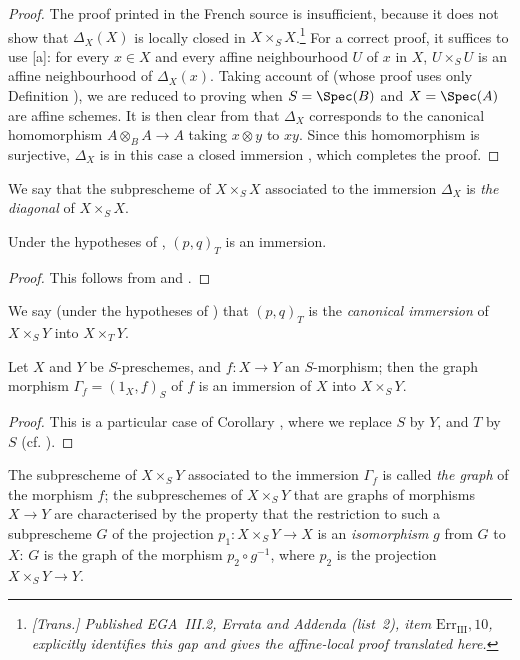 \begin{proof}
The proof printed in the French source is insufficient, because it does not
show that $\Delta_X(X)$ is locally closed in $X\times_S X$.\footnote{\emph{[Trans.] Published EGA~III.2, Errata and Addenda (list~2), item $\mathrm{Err}_{\mathrm{III}},10$, explicitly identifies this gap and gives the affine-local proof translated here.}}
For a correct proof, it suffices to use [a]:
for every $x\in X$ and every affine neighbourhood $U$ of $x$ in $X$,
$U\times_S U$ is an affine neighbourhood of $\Delta_X(x)$.
Taking account of  (whose proof uses only Definition
), we are reduced to proving  when
$S=\Spec(B)$ and $X=\Spec(A)$ are affine schemes.
It is then clear from  that $\Delta_X$ corresponds to the
canonical homomorphism $A\otimes_B A\to A$ taking $x\otimes y$ to $xy$.
Since this homomorphism is surjective, $\Delta_X$ is in this case a closed
immersion , which completes the proof.
\end{proof}

We say that the subprescheme of $X\times_S X$ associated to the immersion $\Delta_X$  is \emph{the diagonal} of $X\times_S X$.

\begin{corollary}[5.3.10]
\label{I.5.3.10}
Under the hypotheses of , $(p,q)_T$ is an immersion.
\end{corollary}

\begin{proof}
This follows from  and .
\end{proof}

We say (under the hypotheses of ) that $(p,q)_T$ is the \emph{canonical immersion} of $X\times_S Y$ into $X\times_T Y$.

\begin{corollary}[5.3.11]
\label{I.5.3.11}
Let $X$ and $Y$ be $S$-preschemes, and $f:X\to Y$ an $S$-morphism;
then the graph morphism $\Gamma_f=(1_X,f)_S$ of $f$  is an immersion of $X$ into $X\times_S Y$.
\end{corollary}

\begin{proof}
This is a particular case of Corollary , where we replace $S$ by $Y$, and $T$ by $S$ (cf. ).
\end{proof}

The subprescheme of $X\times_S Y$ associated to the immersion $\Gamma_f$  is called \emph{the graph} of the morphism $f$;
the subpreschemes of $X\times_S Y$ that are graphs of morphisms $X\to Y$ are characterised by the property that the restriction to such a subprescheme $G$ of the projection $p_1:X\times_S Y\to X$ is an \emph{isomorphism} $g$ from $G$ to $X$:
$G$ is the graph of the morphism $p_2\circ g^{-1}$, where $p_2$ is the projection $X\times_S Y\to Y$.

